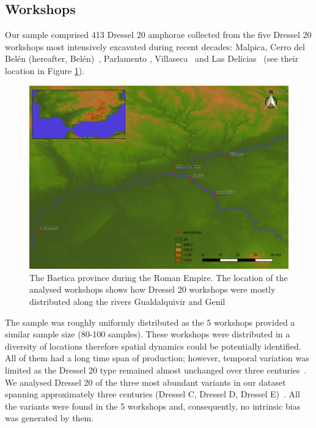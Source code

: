 \documentclass[review]{elsarticle}
\begin{document}
\subsection{Workshops}

Our sample comprised 413 Dressel 20 amphorae collected from the five Dressel 20 workshops most intensively excavated during recent decades: Malpica, Cerro del Belén (hereafter, Belén)~\citep{diaz_trujillo_excavacion_1992}, Parlamento \citep{garcia_vargas_anforas_2000}, Villaseca~\citep{garcia_vargas_enrique_excavacion_????} and Las Delicias~\citep{fernandez_excavacion_2001,_atelier_2014} (see their location in Figure \ref{romanworkshop}).

\begin{figure}[htp]
	\centering
\includegraphics[width=\linewidth]{figs/romanworkshop}
\caption{The Baetica province during the Roman Empire. The location of the analysed workshops shows how Dressel 20 workshops were mostly distributed along the rivers Gualdalquivir and Genil}
\label{romanworkshop}
\end{figure} 

The sample was roughly uniformly distributed as the 5 workshops provided a similar sample size (80-100 samples). These workshops were distributed in a diversity of locations therefore spatial dynamics could be potentially identified. All of them had a long time span of production; however, temporal variation was limited as the Dressel 20 type remained almost unchanged over three centuries~\citep{berni_dressel_2016}. We analysed Dressel 20 of the three most abundant variants in our dataset spanning approximately three centuries (Dressel C, Dressel D, Dressel E)~\citep{martin-kilcher_romischen_1994,berni_millet_epigrafianforica_2008}. All the variants were found in the 5 workshops and, consequently, no intrinsic bias was generated by them. 
\end{document}
